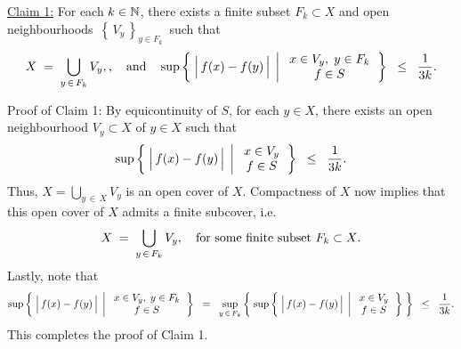 \vskip 0.3cm
\begin{center}
\begin{minipage}{6.0in}
\noindent
\underline{Claim 1:}
\vskip 0.1cm
\noindent
For each $k \in \mathbb{N}$, there exists a finite subset $F_{k} \subset X$ and
open neighbourhoods \,$\left\{\,V_{y}\,\right\}_{y \in F_{k}}$\, such that
\begin{equation*}
X \;=\; \bigcup_{y\,\in\,F_{k}}V_{y},,
\quad\textnormal{and}\quad
\sup\left\{\;
\left\vert\,\overset{{\color{white}.}}{f}(x) - f(y)\,\right\vert
\;\left\vert\;
\begin{array}{c} x \in V_{y}, \; y \in F_{k} \\ f \in S \end{array}
\right.\right\}
\;\; \leq \;\; \dfrac{1}{3k}.
\end{equation*}
\end{minipage}
\end{center}
Proof of Claim 1:\; By equicontinuity of $S$, for each $y \in X$,
there exists an open neighbourhood $V_{y} \subset X$ of $y \in X$
such that
\begin{equation*}
\sup\left\{\;
\left\vert\,\overset{{\color{white}.}}{f}(x) - f(y)\,\right\vert
\;\left\vert\;
\begin{array}{c} x \in V_{y} \\ f \in S \end{array}
\right.\right\}
\;\; \leq \;\; \dfrac{1}{3k}.
\end{equation*}
Thus, $X = \underset{y\,\in\,X}{\bigcup}V_{y}$ is an open cover of $X$.
Compactness of $X$ now implies that this open cover of $X$ admits a finite subcover, i.e.
\begin{equation*}
X \; = \; \bigcup_{y\,\in\,F_{k}}V_{y},
\quad
\textnormal{for some finite subset $F_{k} \subset X$}.
\end{equation*}
Lastly, note that
\begin{equation*}
\sup\left\{\;
\left\vert\,\overset{{\color{white}.}}{f}(x) - f(y)\,\right\vert
\;\left\vert\;
\begin{array}{c} x \in V_{y}, \; y \in F_{k} \\ f \in S \end{array}
\right.\right\}
\;\; = \;\;
\sup_{y\,\in\,F_{k}}
\left\{\;
\sup\left\{\;
\left\vert\,\overset{{\color{white}.}}{f}(x) - f(y)\,\right\vert
\;\left\vert\;
\begin{array}{c} x \in V_{y} \\ f \in S \end{array}
\right.\right\}
\;\right\}
\;\; \leq \;\; \dfrac{1}{3k}.
\end{equation*}
This completes the proof of Claim 1.

